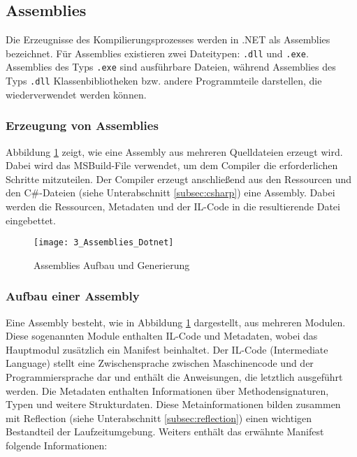 \subsection{Assemblies}
\label{subsec:assemblies}
Die Erzeugnisse des Kompilierungsprozesses werden in .NET als Assemblies \cite{msdn_assembly_manifest} bezeichnet. Für Assemblies existieren zwei Dateitypen: \texttt{.dll} und \texttt{.exe}. Assemblies des Typs \texttt{.exe} sind ausführbare Dateien, während Assemblies des Typs \texttt{.dll} Klassenbibliotheken bzw. andere Programmteile darstellen, die wiederverwendet werden können.

\subsubsection{Erzeugung von Assemblies}
Abbildung \ref{fig:assemblies_dotnet} zeigt, wie eine Assembly aus mehreren Quelldateien erzeugt wird. Dabei wird das MSBuild-File verwendet, um dem Compiler die erforderlichen Schritte mitzuteilen. Der Compiler erzeugt anschließend aus den Ressourcen und den C\#-Dateien (siehe Unterabschnitt \ref{subsec:csharp}) eine Assembly. Dabei werden die Ressourcen, Metadaten und der IL-Code in die resultierende Datei eingebettet.

\begin{figure}[H]
    \centering
    \texttt{[image: 3\_Assemblies\_Dotnet]}
    \caption{Assemblies Aufbau und Generierung}
    \label{fig:assemblies_dotnet}
\end{figure}

\subsubsection{Aufbau einer Assembly}
Eine Assembly besteht, wie in Abbildung \ref{fig:assemblies_dotnet} dargestellt, aus mehreren Modulen. Diese sogenannten Module enthalten IL-Code und Metadaten, wobei das Hauptmodul zusätzlich ein Manifest beinhaltet.  
Der IL-Code (Intermediate Language) stellt eine Zwischensprache zwischen Maschinencode und der Programmiersprache dar und enthält die Anweisungen, die letztlich ausgeführt werden.  
Die Metadaten enthalten Informationen über Methodensignaturen, Typen und weitere Strukturdaten. Diese Metainformationen bilden zusammen mit Reflection (siehe Unterabschnitt \ref{subsec:reflection}) einen wichtigen Bestandteil der Laufzeitumgebung. Weiters enthält das erwähnte Manifest folgende Informationen:


